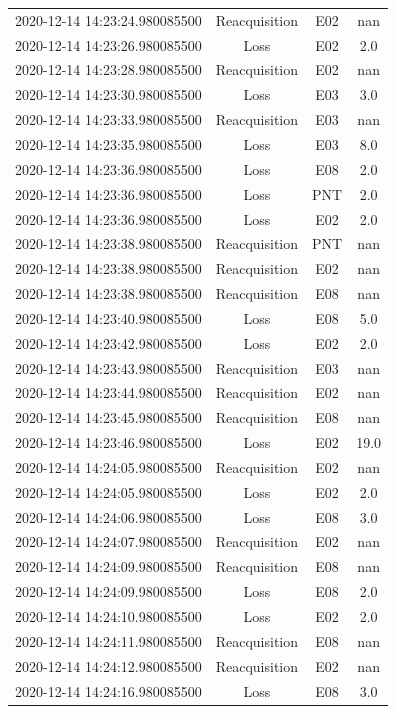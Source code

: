 \begin{enumerate}
\begin{longtabu}{cccc}
2020{-}12{-}14 14:23:24.980085500&Reacquisition&E02&nan\\%
2020{-}12{-}14 14:23:26.980085500&Loss&E02&2.0\\%
2020{-}12{-}14 14:23:28.980085500&Reacquisition&E02&nan\\%
2020{-}12{-}14 14:23:30.980085500&Loss&E03&3.0\\%
2020{-}12{-}14 14:23:33.980085500&Reacquisition&E03&nan\\%
2020{-}12{-}14 14:23:35.980085500&Loss&E03&8.0\\%
2020{-}12{-}14 14:23:36.980085500&Loss&E08&2.0\\%
2020{-}12{-}14 14:23:36.980085500&Loss&PNT&2.0\\%
2020{-}12{-}14 14:23:36.980085500&Loss&E02&2.0\\%
2020{-}12{-}14 14:23:38.980085500&Reacquisition&PNT&nan\\%
2020{-}12{-}14 14:23:38.980085500&Reacquisition&E02&nan\\%
2020{-}12{-}14 14:23:38.980085500&Reacquisition&E08&nan\\%
2020{-}12{-}14 14:23:40.980085500&Loss&E08&5.0\\%
2020{-}12{-}14 14:23:42.980085500&Loss&E02&2.0\\%
2020{-}12{-}14 14:23:43.980085500&Reacquisition&E03&nan\\%
2020{-}12{-}14 14:23:44.980085500&Reacquisition&E02&nan\\%
2020{-}12{-}14 14:23:45.980085500&Reacquisition&E08&nan\\%
2020{-}12{-}14 14:23:46.980085500&Loss&E02&19.0\\%
2020{-}12{-}14 14:24:05.980085500&Reacquisition&E02&nan\\%
2020{-}12{-}14 14:24:05.980085500&Loss&E02&2.0\\%
2020{-}12{-}14 14:24:06.980085500&Loss&E08&3.0\\%
2020{-}12{-}14 14:24:07.980085500&Reacquisition&E02&nan\\%
2020{-}12{-}14 14:24:09.980085500&Reacquisition&E08&nan\\%
2020{-}12{-}14 14:24:09.980085500&Loss&E08&2.0\\%
2020{-}12{-}14 14:24:10.980085500&Loss&E02&2.0\\%
2020{-}12{-}14 14:24:11.980085500&Reacquisition&E08&nan\\%
2020{-}12{-}14 14:24:12.980085500&Reacquisition&E02&nan\\%
2020{-}12{-}14 14:24:16.980085500&Loss&E08&3.0\\%

\end{longtabu}
\end{enumerate}
